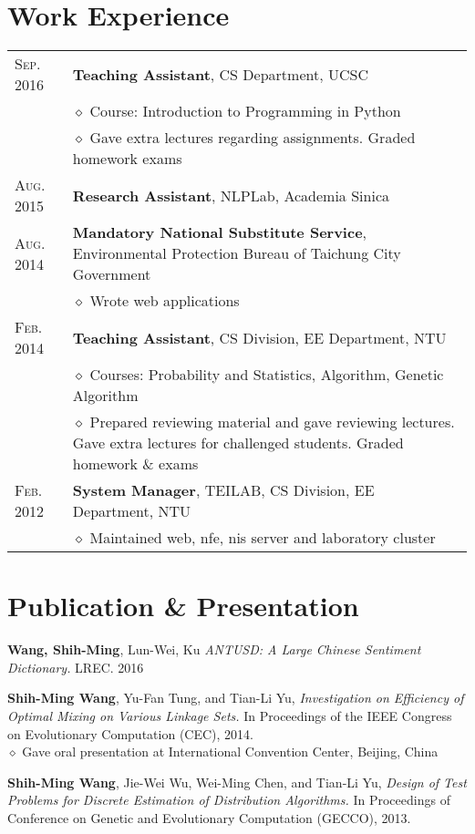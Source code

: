 \documentclass[a4paper,10pt]{article}
\begin{document}
\section{Work Experience}
\begin{tabular}{l|p{15cm}}
    \textsc{Sep.} 2016 & \textbf{Teaching Assistant}, CS Department, UCSC\\
                    & $\diamond$ Course: Introduction to Programming in Python\\
                    & $\diamond$ Gave extra lectures regarding assignments. Graded homework exams\\
    \textsc{Aug.} 2015 & \textbf{Research Assistant}, NLPLab, Academia Sinica\\
    \textsc{Aug.} 2014 & \textbf{Mandatory National Substitute Service}, Environmental Protection Bureau of Taichung City Government\\
                    & $\diamond$ Wrote web applications\\
    \textsc{Feb.} 2014 & \textbf{Teaching Assistant}, CS Division, EE Department, NTU\\
                    & $\diamond$ Courses: Probability and Statistics, Algorithm, Genetic Algorithm\\
                    & $\diamond$ Prepared reviewing material and gave reviewing lectures. Gave extra lectures for challenged students. Graded homework \& exams\\
    \textsc{Feb.} 2012  & \textbf{System Manager}, TEILAB, CS Division, EE Department, NTU\\
                    & $\diamond$ Maintained web, nfe, nis server and laboratory cluster
\end{tabular}


\section{Publication \& Presentation}
\begin{hangparas}{.25in}{1}
    \textbf{Wang, Shih-Ming}, Lun-Wei, Ku \textit{ANTUSD: A Large Chinese Sentiment Dictionary.} LREC. 2016
\end{hangparas}
\begin{hangparas}{.25in}{1}
    \textbf{Shih-Ming Wang}, Yu-Fan Tung, and Tian-Li Yu, \textit{Investigation on Efficiency of Optimal Mixing on Various Linkage Sets.} In Proceedings of the IEEE Congress on Evolutionary Computation (CEC), 2014.\\
    $\diamond$ \footnotesize{Gave oral presentation at International Convention Center, Beijing, China}
\end{hangparas}
\begin{hangparas}{.25in}{1}
    \textbf{Shih-Ming Wang}, Jie-Wei Wu, Wei-Ming Chen, and Tian-Li Yu, \textit{Design of Test Problems for Discrete Estimation of Distribution Algorithms.} In Proceedings of Conference on Genetic and Evolutionary Computation (GECCO), 2013.
\end{hangparas}
\end{document}
